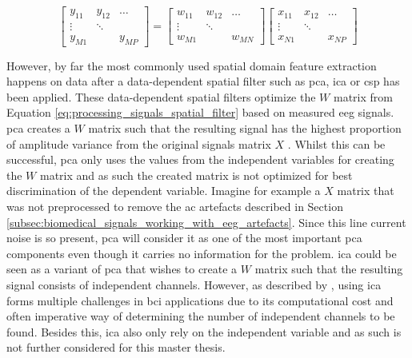 \begin{equation}
    \label{eq:processing_signals_spatial_filter}
    \begin{bmatrix} 
        y_{11} & y_{12} & \dots \\
        \vdots & \ddots & \\
        y_{M1} &        & y_{MP} 
    \end{bmatrix} = 
    \begin{bmatrix} 
        w_{11} & w_{12} & \dots \\
        \vdots & \ddots & \\
        w_{M1} &        & w_{MN} 
    \end{bmatrix}
    \begin{bmatrix} 
        x_{11} & x_{12} & \dots \\
        \vdots & \ddots & \\
        x_{N1} &        & x_{NP} 
    \end{bmatrix}
\end{equation}


However, by far the most commonly used spatial domain feature extraction happens on data after a data-dependent spatial filter such as \gls{pca}, \gls{ica} or \gls{csp} has been applied.
These data-dependent spatial filters optimize the $W$ matrix from Equation \ref{eq:processing_signals_spatial_filter} based on measured \gls{eeg} signals.
\Gls{pca} creates a $W$ matrix such that the resulting signal has the highest proportion of amplitude variance from the original signals matrix $X$ \citep{bci_book}.
Whilst this can be successful, \gls{pca} only uses the values from the independent variables for creating the $W$ matrix and as such the created matrix is not optimized for best discrimination of the dependent variable.
Imagine for example a $X$ matrix that was not preprocessed to remove the \gls{ac} artefacts described in Section \ref{subsec:biomedical_signals_working_with_eeg_artefacts}.
Since this line current noise is so present, \gls{pca} will consider it as one of the most important \gls{pca} components even though it carries no information for the problem.
\Gls{ica} could be seen as a variant of \gls{pca} that wishes to create a $W$ matrix such that the resulting signal consists of independent channels.
However, as described by \citet{bci_book}, using \gls{ica} forms multiple challenges in \gls{bci} applications due to its computational cost and often imperative way of determining the number of independent channels to be found.
Besides this, \gls{ica} also only rely on the independent variable and as such is not further considered for this master thesis.

